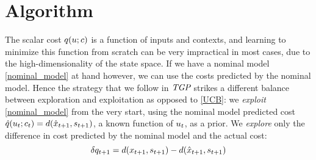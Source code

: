 \section{Algorithm \alg}\label{sec:algorithm}


The scalar cost $q(u;c)$ is a function of inputs and contexts, and learning to minimize this function from scratch can be very impractical in most cases, due to the high-dimensionality of the state space. If we have a nominal model \eqref{nominal_model} at hand however, we can use the costs predicted by the nominal model. Hence the strategy that we follow in $\emph{TGP}$ strikes a different balance between exploration and exploitation as opposed to \eqref{UCB}: we \emph{exploit} \eqref{nominal_model} from the very start, using the nominal model predicted cost $\hat{q}(u_t;c_t) = d(\hat{x}_{t+1},s_{t+1})$, a known function of $u_t$, as a prior. 
We \emph{explore} only the difference in cost predicted by the nominal model and the actual cost:
\begin{equation}
\delta q_{t+1} = d(x_{t+1},s_{t+1}) - d(\hat{x}_{t+1},s_{t+1}) \label{eq:deltaC}
\end{equation}


